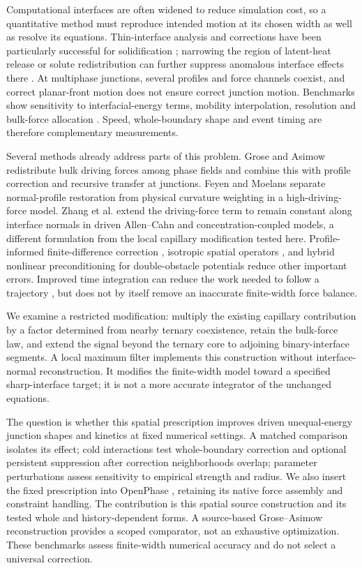 Computational interfaces are often widened to reduce simulation cost, so a quantitative method must reproduce intended motion at its chosen width as well as resolve its equations. Thin-interface analysis and corrections have been particularly successful for solidification \citep{karma1998,karma2001,eiken2006}; narrowing the region of latent-heat release or solute redistribution can further suppress anomalous interface effects there \citep{kim2004}. At multiphase junctions, several profiles and force channels coexist, and correct planar-front motion does not ensure correct junction motion. Benchmarks show sensitivity to interfacial-energy terms, mobility interpolation, resolution and bulk-force allocation \citep{daubner2023,nani2024,hoffrogge2025}. Speed, whole-boundary shape and event timing are therefore complementary measurements.

Several methods already address parts of this problem. Grose and Asimow \citep{grose2022} redistribute bulk driving forces among phase fields and combine this with profile correction and recursive transfer at junctions. Feyen and Moelans \citep{feyen2023} separate normal-profile restoration from physical curvature weighting in a high-driving-force model. Zhang et al. \citep{zhang2023large} extend the driving-force term to remain constant along interface normals in driven Allen--Cahn and concentration-coupled models, a different formulation from the local capillary modification tested here. Profile-informed finite-difference correction \citep{eiken2012}, isotropic spatial operators \citep{tang2024}, and hybrid nonlinear preconditioning for double-obstacle potentials \citep{sakane2026} reduce other important errors. Improved time integration can reduce the work needed to follow a trajectory \citep{seiz2026}, but does not by itself remove an inaccurate finite-width force balance.

We examine a restricted modification: multiply the existing capillary contribution by a factor determined from nearby ternary coexistence, retain the bulk-force law, and extend the signal beyond the ternary core to adjoining binary-interface segments. A local maximum filter implements this construction without interface-normal reconstruction. It modifies the finite-width model toward a specified sharp-interface target; it is not a more accurate integrator of the unchanged equations.

The question is whether this spatial prescription improves driven unequal-energy junction shapes and kinetics at fixed numerical settings. A matched comparison isolates its effect; cold interactions test whole-boundary correction and optional persistent suppression after correction neighborhoods overlap; parameter perturbations assess sensitivity to empirical strength and radius. We also insert the fixed prescription into OpenPhase \citep{tegeler2017,openphase}, retaining its native force assembly and constraint handling. The contribution is this spatial source construction and its tested whole and history-dependent forms. A source-based Grose--Asimow reconstruction provides a scoped comparator, not an exhaustive optimization. These benchmarks assess finite-width numerical accuracy and do not select a universal correction.
